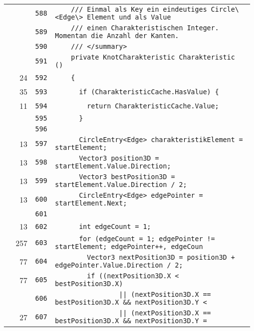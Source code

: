 \documentclass[a4paper,10pt]{article}
\begin{document}
\begin{longtable}[l]{lrrl}
\cellcolor{gray} &  & \verb~588~ & \verb~    /// Einmal als Key ein eindeutiges Circle\<Edge\> Element und als Value~\\
\cellcolor{gray} &  & \verb~589~ & \verb~    /// einen Charakteristischen Integer. Momentan die Anzahl der Kanten.~\\
\cellcolor{gray} &  & \verb~590~ & \verb~    /// </summary>~\\
\cellcolor{gray} &  & \verb~591~ & \verb~    private KnotCharakteristic Charakteristic ()~\\
\cellcolor{green} & 24 & \verb~592~ & \verb~    {~\\
\cellcolor{green} & 35 & \verb~593~ & \verb~      if (CharakteristicCache.HasValue) {~\\
\cellcolor{green} & 11 & \verb~594~ & \verb~        return CharakteristicCache.Value;~\\
\cellcolor{gray} &  & \verb~595~ & \verb~      }~\\
\cellcolor{gray} &  & \verb~596~ & \verb~~\\
\cellcolor{green} & 13 & \verb~597~ & \verb~      CircleEntry<Edge> charakteristikElement = startElement;~\\
\cellcolor{green} & 13 & \verb~598~ & \verb~      Vector3 position3D = startElement.Value.Direction;~\\
\cellcolor{green} & 13 & \verb~599~ & \verb~      Vector3 bestPosition3D = startElement.Value.Direction / 2;~\\
\cellcolor{green} & 13 & \verb~600~ & \verb~      CircleEntry<Edge> edgePointer = startElement.Next;~\\
\cellcolor{gray} &  & \verb~601~ & \verb~~\\
\cellcolor{green} & 13 & \verb~602~ & \verb~      int edgeCount = 1;~\\
\cellcolor{green} & 257 & \verb~603~ & \verb~      for (edgeCount = 1; edgePointer != startElement; edgePointer++, edgeCoun~\\
\cellcolor{green} & 77 & \verb~604~ & \verb~        Vector3 nextPosition3D = position3D + edgePointer.Value.Direction / 2;~\\
\cellcolor{green} & 77 & \verb~605~ & \verb~        if ((nextPosition3D.X < bestPosition3D.X)~\\
\cellcolor{gray} &  & \verb~606~ & \verb~                || (nextPosition3D.X == bestPosition3D.X && nextPosition3D.Y <~\\
\cellcolor{green} & 27 & \verb~607~ & \verb~                || (nextPosition3D.X == bestPosition3D.X && nextPosition3D.Y =~\\

\end{longtable}
\end{document}
